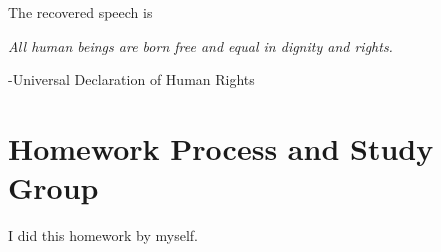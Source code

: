 \documentclass[]{article}
\begin{document}
The recovered speech is 
\begin{displayquote}
	\textit{All human beings are born free and equal in dignity and rights.}
\end{displayquote}
\begin{flushright}
	-Universal Declaration of Human Rights
\end{flushright}

\newpage



\section{Homework Process and Study Group}

I did this homework by myself. 
\end{document}
